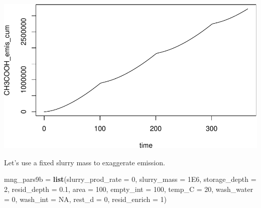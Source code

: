 \documentclass[
]{article}
\newenvironment{Shaded}{\begin{snugshade}}{\end{snugshade}}
\newcommand{\AttributeTok}[1]{\textcolor[rgb]{0.13,0.29,0.53}{#1}}
\newcommand{\ConstantTok}[1]{\textcolor[rgb]{0.56,0.35,0.01}{#1}}
\newcommand{\DecValTok}[1]{\textcolor[rgb]{0.00,0.00,0.81}{#1}}
\newcommand{\FloatTok}[1]{\textcolor[rgb]{0.00,0.00,0.81}{#1}}
\newcommand{\FunctionTok}[1]{\textcolor[rgb]{0.13,0.29,0.53}{\textbf{#1}}}
\newcommand{\NormalTok}[1]{#1}
\newcommand{\OtherTok}[1]{\textcolor[rgb]{0.56,0.35,0.01}{#1}}
\begin{document}
\includegraphics{simple_demo_files/figure-latex/unnamed-chunk-64-5.pdf}

Let's use a fixed slurry mass to exaggerate emission.

\begin{Shaded}
\begin{Highlighting}[]
\NormalTok{mng\_pars9b }\OtherTok{=} \FunctionTok{list}\NormalTok{(}\AttributeTok{slurry\_prod\_rate =} \DecValTok{0}\NormalTok{, }
                  \AttributeTok{slurry\_mass =} \FloatTok{1E6}\NormalTok{,     }
                  \AttributeTok{storage\_depth =} \DecValTok{2}\NormalTok{,     }
                  \AttributeTok{resid\_depth =} \FloatTok{0.1}\NormalTok{,      }
                  \AttributeTok{area =} \DecValTok{100}\NormalTok{,              }
                  \AttributeTok{empty\_int =} \DecValTok{100}\NormalTok{,          }
                  \AttributeTok{temp\_C =} \DecValTok{20}\NormalTok{,}
                  \AttributeTok{wash\_water =} \DecValTok{0}\NormalTok{,            }
                  \AttributeTok{wash\_int =} \ConstantTok{NA}\NormalTok{,}
                  \AttributeTok{rest\_d =} \DecValTok{0}\NormalTok{,}
                  \AttributeTok{resid\_enrich =} \DecValTok{1}\NormalTok{)}
\end{Highlighting}
\end{Shaded}
\end{document}
